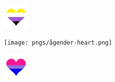 \documentclass{article}
\begin{document}




\includegraphics[width=0.1\textwidth]{pngs/enby-heart.png}

\texttt{[image: pngs/ågender-heart.png]}

\includegraphics[width=0.1\textwidth]{pngs 1/bi heart.png}




\end{document}
